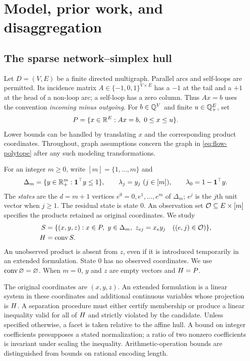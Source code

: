 \section{Model, prior work, and disaggregation}\label{sec:foundations}

\subsection{The sparse network--simplex hull}\label{subsec:model}
Let $D=(V,E)$ be a finite directed multigraph. Parallel arcs and self-loops
are permitted. Its incidence matrix $A\in\{-1,0,1\}^{V\times E}$ has a $-1$
at the tail and a $+1$ at the head of a non-loop arc; a self-loop has a zero
column. Thus $Ax=b$ uses the convention \emph{incoming minus outgoing}.
For $b\in\mathbb Q^V$ and finite $u\in\mathbb Q_+^E$, set
\begin{equation}\label{eq:flow-polytope}
 P=\{x\in\mathbb R^E:Ax=b,\ 0\le x\le u\}.
\end{equation}
Lower bounds can be handled by translating $x$ and the corresponding product
coordinates. Throughout, graph assumptions concern the graph in
\eqref{eq:flow-polytope} after any such modeling transformations.

For an integer $m\ge0$, write $[m]=\{1,\ldots,m\}$ and
\begin{equation}\label{eq:simplex}
 \Delta_m=\{y\in\mathbb R_+^m:\mathbf 1^\top y\le1\},\qquad
 \lambda_j=y_j\ (j\in[m]),\qquad
 \lambda_0=1-\mathbf 1^\top y.
\end{equation}
The \emph{states} are the $d=m+1$ vertices $e^0=0,e^1,\ldots,e^m$ of
$\Delta_m$; $e^j$ is the $j$th unit vector when $j\ge1$. The residual state
is state $0$. An observation set $\mathcal O\subseteq E\times[m]$ specifies
the products retained as original coordinates. We study
\begin{align}
 S&=\{(x,y,z):x\in P,\ y\in\Delta_m,
             \ z_{ej}=x_e y_j\quad((e,j)\in\mathcal O)\},\label{eq:graph-set}\\
 H&=\operatorname{conv} S.\label{eq:sparse-hull}
\end{align}
An unobserved product is absent from $z$, even if it is introduced temporarily
in an extended formulation. State $0$ has no observed coordinates.
We use $\operatorname{conv}\varnothing=\varnothing$. When $m=0$, $y$ and $z$ are empty
vectors and $H=P$.

The original coordinates are $(x,y,z)$. An extended formulation is a linear
system in these coordinates and additional continuous variables whose
projection is $H$. A separation procedure must either certify membership
or produce a linear inequality valid for all of $H$ and strictly violated
by the candidate. Unless specified otherwise, a facet is taken relative to
the affine hull. A bound on integer coefficients presupposes a stated
normalization; a ratio of two nonzero coefficients is invariant under scaling
the inequality. Arithmetic-operation bounds are distinguished from bounds
on rational encoding length.

